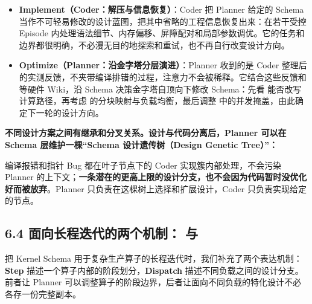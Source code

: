 \begin{itemize}
\item
\textbf{Implement（Coder：解压与信息恢复）}：Coder 把 Planner 给定的 Schema 当作不可轻易修改的设计蓝图，把其中省略的工程信息恢复出来：在若干受控 Episode 内处理语法细节、内存偏移、屏障配对和局部参数调优。它的任务和边界都很明确，不必漫无目的地探索和重试，也不再自行改变设计方向。


\item
\textbf{Optimize（Planner：沿金字塔分层演进）}：Planner 收到的是 Coder 整理后的实测反馈，不夹带编译排错的过程，注意力不会被稀释。它结合这些反馈和  等硬件 Wiki，沿 Schema 决策金字塔自顶向下修改 Schema：先看  能否改写计算路径，再考虑  的分块映射与负载均衡，最后调整  中的并发掩盖，由此确定下一轮的设计方向。


\end{itemize}


\textbf{不同设计方案之间有继承和分叉关系。设计与代码分离后，Planner 可以在 Schema 层维护一棵“Schema 设计遗传树（Design Genetic Tree）”：}


\begin{DiagramBlock}
\end{DiagramBlock}
编译报错和指针 Bug 都在叶子节点下的 Coder 实现簇内部处理，不会污染 Planner 的上下文；\textbf{一条潜在的更高上限的设计分支，也不会因为代码暂时没优化好而被放弃}。Planner 只负责在这棵树上选择和扩展设计，Coder 只负责实现给定的节点。


\SourceSeparator
\subsection{6.4 面向长程迭代的两个机制： 与 }
把 Kernel Schema 用于复杂生产算子的长程迭代时，我们补充了两个表达机制：\textbf{Step} 描述一个算子内部的阶段划分，\textbf{Dispatch} 描述不同负载之间的设计分支。前者让 Planner 可以调整算子的阶段边界，后者让面向不同负载的特化设计不必各存一份完整副本。


